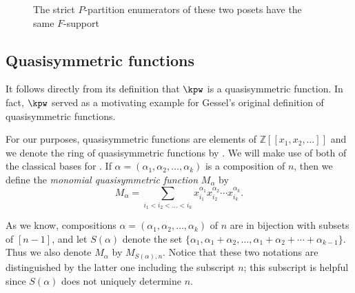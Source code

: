 \begin{remark}
\begin{figure}
\begin{center}
\end{center}
\caption[caption]{The strict $P$-partition enumerators of these two posets have the same $F$-support}
\label{fig:f_support}
\end{figure}
\end{remark}


\subsection{Quasisymmetric functions}\label{sub:qsym}

It follows directly from its definition that $\kpw$ is a quasisymmetric function.  In fact, $\kpw$ served as a motivating example for Gessel's original definition \cite{Ges84} of quasisymmetric functions.   

For our purposes, quasisymmetric functions are elements of $\mathbb{Z}[[x_1, x_2, \ldots]]$ and we denote the ring of quasisymmetric functions by \qsym. We will make use of both of the classical bases for \qsym.  If $\alpha = (\alpha_1, \alpha_2, \ldots, \alpha_k)$ is a composition of $n$, then we define the \emph{monomial quasisymmetric function} $M_\alpha$ by
\[
M_\alpha = \sum_{i_1 < i_2 < \ldots < i_k} x_{i_1}^{\alpha_1} x_{i_2}^{\alpha_2} \cdots x_{i_k}^{\alpha_k}.
\]

As we know, compositions $\alpha = (\alpha_1, \alpha_2, \ldots, \alpha_k)$ of $n$ are in bijection with subsets of $[n-1]$, and let $S(\alpha)$ denote the set
$\{\alpha_1, \alpha_1+\alpha_2, \ldots, \alpha_1+\alpha_2 + \cdots+ \alpha_{k-1}\}$.  Thus we also denote $M_\alpha$ by $M_{S(\alpha), n}$.  Notice that these two notations are distinguished by the latter one including the subscript $n$; this subscript is helpful since $S(\alpha)$ does not uniquely determine $n$.  

